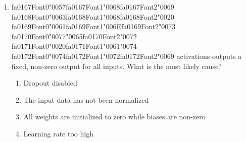 \documentclass[12pt]{article}
\begin{document}
\begin{enumerate}[label=Q\arabic*.]
 \item {\csname fa0167Font0\endcsname\char"0057}{\csname fa0167Font1\endcsname\char"0068}{\csname fa0167Font2\endcsname\char"0069} {\csname fa0168Font0\endcsname\char"0063}{\csname fa0168Font1\endcsname\char"0068}{\csname fa0168Font2\endcsname\char"0020} {\csname fa0169Font0\endcsname\char"0061}{\csname fa0169Font1\endcsname\char"006E}{\csname fa0169Font2\endcsname\char"0073} {\csname fa0170Font0\endcsname\char"0077}{\char"0065}{\csname fa0170Font2\endcsname\char"0072} {\csname fa0171Font0\endcsname\char"0020}{\csname fa0171Font1\endcsname\char"0061}{\char"0074} {\csname fa0172Font0\endcsname\char"0074}{\csname fa0172Font1\endcsname\char"0072}{\csname fa0172Font2\endcsname\char"0069} activations outputs a fixed, non-zero output for all inputs. What is the most likely cause?
 \begin{enumerate}[label=(\Alph*)]
     \item Dropout disabled
     \item The input data has not been normalized
     \item All weights are initialized to zero while biases are non-zero
     \item Learning rate too high
 \end{enumerate}
 

\end{enumerate}
\end{document}
